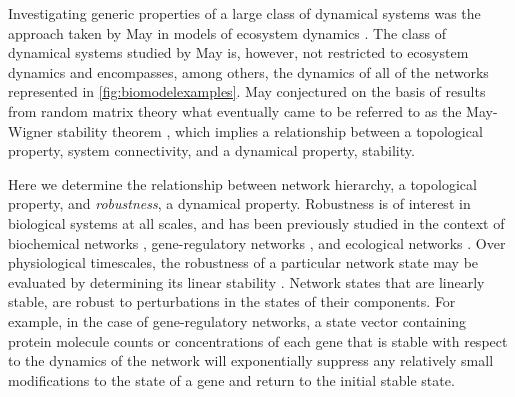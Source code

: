 Investigating generic properties of a large class of dynamical systems was the approach taken by May in models of ecosystem dynamics \cite{Gardner1970,May1972}. The class of dynamical systems studied by May is, however, not restricted to ecosystem dynamics and encompasses, among others, the dynamics of all of the networks represented in \ref{fig:biomodelexamples}. May conjectured on the basis of results from random matrix theory what eventually came to be referred to as the May-Wigner stability theorem \cite{Cohen1984,May1972a,Radius2014,Majumdar2014}, which implies a relationship between a topological property, system connectivity, and a dynamical property, stability.


Here we determine the relationship between network hierarchy, a topological property, and \emph{robustness}, a dynamical property. Robustness is of interest in biological systems at all scales, and has been previously studied in the context of biochemical networks \cite{Alon1999,Shinar2010}, gene-regulatory networks \cite{VanNimwegen1999,Siegal2002,Draghi2010,Wagner2013}, and ecological networks \cite{Rohr2014}. Over physiological timescales, the robustness of a particular network state may be evaluated by determining its linear stability \cite{Davis1962}. Network states that are linearly stable, are robust to perturbations in the states of their components. For example, in the case of gene-regulatory networks, a state vector containing protein molecule counts or concentrations of each gene that is stable with respect to the dynamics of the network will exponentially suppress any relatively small modifications to the state of a gene and return to the initial stable state.

